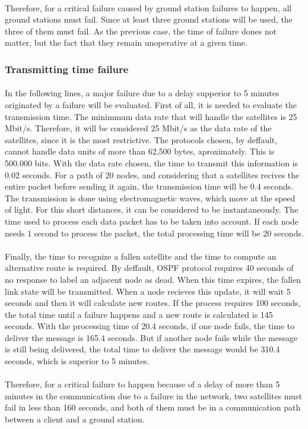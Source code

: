 \paragraph{}Therefore, for a critical failure caused by ground station failures to happen, all ground stations must fail. Since at least three ground stations will be used, the three of them must fail. As the previous case, the time of failure dones not matter, but the fact that they remain unoperative at a given time.

\subsubsection{Transmitting time failure}

\paragraph{}In the following lines, a major failure due to a delay supperior to 5 minutes originated by a failure will be evaluated. First of all, it is needed to evaluate the transmission time. The minimmum data rate that will handle the satellites is 25 Mbit/s. Therefore, it will be considered 25 Mbit/s as the data rate of the satellites, since it is the most restrictive. The protocols chosen, by deffault, cannot handle data units of more than 62,500 bytes, aproximately. This is 500.000 bits. With the data rate chosen, the time to transmit this information is 0.02 seconds. For a path of 20 nodes, and considering that a satellites recives the entire packet before sending it again, the transmission time will be 0.4 seconds. The transmission is done using electromagnetic waves, which move at the speed of light. For this short distances, it can be considered to be instantaneously. The time used to process each data packet has to be taken into account. If each node needs 1 second to process the packet, the total processing time will be 20 seconds. 

\paragraph{}Finally, the time to recognize a fallen satellite and the time to compute an alternative route is required. By deffault, OSPF protocol requires 40 seconds of no response to label an adjacent node as dead. When this time expires, the fallen link state will be transmitted. When a node recieves this update, it will wait 5 seconds and then it will calculate new routes. If the process requires 100 seconds, the total time until a failure happens and a new route is calculated is 145 seconds. With the processing time of 20.4 seconds, if one node fails, the time to deliver the message is 165.4 seconds. But if another node fails while the message is still being delivered, the total time to deliver the message would be 310.4 seconds, which is superior to 5 minutes.

\paragraph{}Therefore, for a critical failure to happen because of a delay of more than 5 minutes in the communication due to a failure in the network, two satellites must fail in less than 160 seconds, and both of them must be in a communication path between a client and a ground station.




 